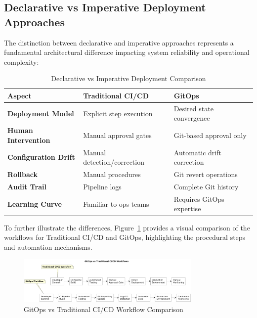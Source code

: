 \subsection{Declarative vs Imperative Deployment Approaches}

The distinction between declarative and imperative approaches represents a fundamental architectural difference impacting system reliability and operational complexity:

\begin{table}[h]
\centering
\caption{Declarative vs Imperative Deployment Comparison}
\label{tab:declarative_imperative_comparison}
\renewcommand{\arraystretch}{1.4}
\scriptsize
\begin{tabular}{|p{2.5cm}|p{4.5cm}|p{4.5cm}|}
\hline
\textbf{Aspect} & \textbf{Traditional CI/CD} & \textbf{GitOps} \\
\hline
\textbf{Deployment Model} & Explicit step execution & Desired state convergence \\
\hline
\textbf{Human Intervention} & Manual approval gates & Git-based approval only \\
\hline
\textbf{Configuration Drift} & Manual detection/correction & Automatic drift correction \\
\hline
\textbf{Rollback} & Manual procedures & Git revert operations \\
\hline
\textbf{Audit Trail} & Pipeline logs & Complete Git history \\
\hline
\textbf{Learning Curve} & Familiar to ops teams & Requires GitOps expertise \\
\hline
\end{tabular}
\end{table}

To further illustrate the differences, Figure~\ref{fig:gitops-vs-traditional-cicd} provides a visual comparison of the workflows for Traditional CI/CD and GitOps, highlighting the procedural steps and automation mechanisms.

\begin{figure}[h]
\centering
\includegraphics[width=0.8\textwidth]{figures/GitOp-vs-Traditional-CICD-Workflow-Comparison.png}
\caption{GitOps vs Traditional CI/CD Workflow Comparison}
\label{fig:gitops-vs-traditional-cicd}
\end{figure}

